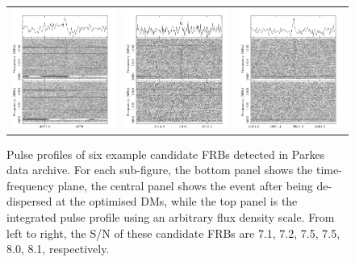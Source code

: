 \documentclass[fleqn,usenatbib]{mnras}
\begin{document}
\begin{figure}
\begin{center}
\begin{tabular}{ccc}
    \includegraphics[width=5.5cm]{exhibition/7.54_SMC014_038D1.sf_4877.456.png} & 
    \includegraphics[width=5.5cm]{exhibition/7.98_SMC014_059C1.sf_3014.774.png} & 
    \includegraphics[width=5.5cm]{exhibition/8.07_SMC016_00181.sf_2861.409.png}\\
    \end{tabular}
    \caption{Pulse profiles of six example candidate FRBs detected in Parkes data archive. For each sub-figure, the bottom panel shows the time-frequency plane, the central panel shows the event after being de-dispersed at the optimised DMs, while the top panel is the integrated pulse profile using an arbitrary flux density scale. From left to right, the S/N of these candidate FRBs are 7.1, 7.2, 7.5, 7.5, 8.0, 8.1, respectively.} 
    \end{center}
    \label{figure:frb_spc}
\end{figure}
\end{document}
